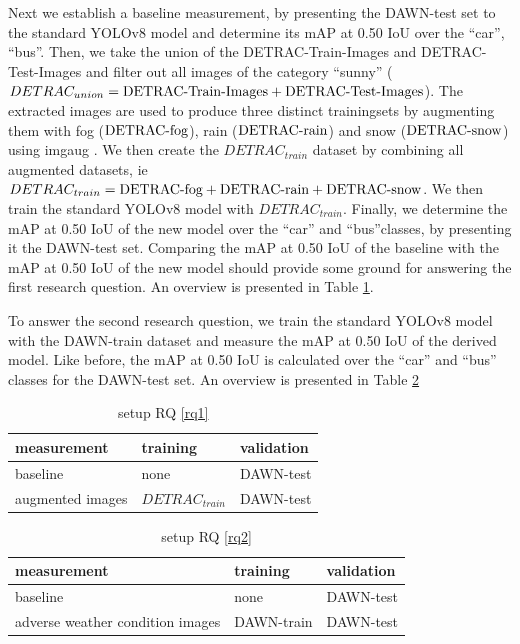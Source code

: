 \documentclass[]{article}
\begin{document}
Next we establish a baseline measurement, by presenting the DAWN-test set to the standard YOLO{\small v8} model and determine its mAP at 0.50 IoU over the ``car'', ``bus''. Then, we take the union of the DETRAC-Train-Images and DETRAC-Test-Images and filter out all images of the category ``sunny'' ($DETRAC_{union} = \textnormal{DETRAC-Train-Images} + \textnormal{DETRAC-Test-Images}$). The extracted images are used to produce three distinct trainingsets by augmenting them with fog ($\textnormal{DETRAC-fog}$), rain ($\textnormal{DETRAC-rain}$) and snow ($\textnormal{DETRAC-snow}$) using imgaug \cite{imgaug}.  We then create the $DETRAC_{train}$ dataset by combining all augmented datasets, ie $DETRAC_{train} = \textnormal{DETRAC-fog} + \textnormal{DETRAC-rain} + \textnormal{DETRAC-snow}$. We then train the standard YOLO{\small v8} model with $DETRAC_{train}$. Finally, we determine the mAP at 0.50 IoU of the new model over the  ``car'' and ``bus''classes, by presenting it the DAWN-test set. Comparing the mAP at 0.50 IoU of the baseline with the mAP at 0.50 IoU of the new model should provide some ground for answering the first research question.  An overview is presented in Table \ref{table:setuprq1}.
	
	To answer the second research question, we train the standard YOLO{\small v8} model with the DAWN-train dataset and measure the mAP at 0.50 IoU of the derived model. Like before, the mAP at 0.50 IoU is calculated over the ``car'' and ``bus'' classes for the DAWN-test set.  An overview is presented in Table \ref{table:setuprq2}

\begin{table}[!ht]
	\begin{tabular}{lll}
		\toprule
		\textbf{measurement} & \textbf{training} & \textbf{validation} \\
		\midrule
		baseline & none & DAWN-test \\
		augmented images & $DETRAC_{train}$ & DAWN-test \\
		\bottomrule
	\end{tabular}
	\caption{setup RQ \ref{rq1}}
	\label{table:setuprq1}
\end{table}

\begin{table}[!ht]
	\begin{tabular}{lll}
		\toprule
		\textbf{measurement} & \textbf{training} & \textbf{validation} \\
		\midrule
		baseline & none & DAWN-test \\
		adverse weather condition images & DAWN-train & DAWN-test \\
		\bottomrule
	\end{tabular}
	\caption{setup RQ \ref{rq2}}
	\label{table:setuprq2}
\end{table}
\end{document}
